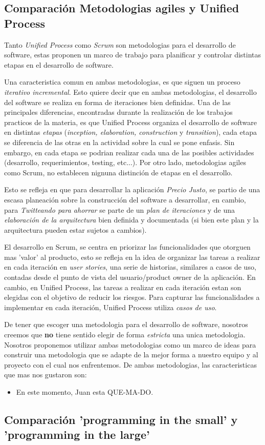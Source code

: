 \subsection{Comparación Metodologias agiles y Unified Process}

	Tanto \emph{Unified Process} como \emph{Scrum} son metodologias para el desarrollo de software, estas proponen un marco de trabajo para planificar y controlar distintas etapas en el desarrollo de software.

	Una caracteristica comun en ambas metodologias, es que siguen un proceso \emph{iterativo incremental}. Esto quiere decir que en ambas metodologias, el desarrollo del software se realiza en forma de iteraciones bien definidas. Una de las principales diferencias, encontradas durante la realización de los trabajos practicos de la materia, es que Unified Process organiza el desarrollo de software en distintas \emph{etapas} (\emph{inception, elaboration, construction} y \emph{transition}), cada etapa se diferencia de las otras en la actividad sobre la cual se pone enfasis. Sin embargo, en cada etapa se podrian realizar cada una de las posibles actividades (desarrollo, requerimientos, testing, etc...). Por otro lado, metodologias agiles como Scrum, no establecen nignuna distinción de etapas en el desarrollo.

	Esto se refleja en que para desarrollar la aplicación \emph{Precio Justo}, se partio de una escasa planeación sobre la construcción del software a desarrollar, en cambio, para \emph{Twitteando para ahorrar} se parte de un \emph{plan de iteraciones} y de una \emph{elaboración de la arquitectura} bien definida y documentada (si bien este plan y la arquitectura pueden estar sujetos a cambios).

	El desarrollo en Scrum, se centra en priorizar las funcionalidades que otorguen mas 'valor' al producto, esto se refleja en la idea de organizar las tareas a realizar en cada iteración en \emph{user stories}, una serie de historias, similares a casos de uso, contadas desde el punto de vista del usuario/product owner de la aplicación. En cambio, en Unified Process, las tareas a realizar en cada iteración estan son elegidas con el objetivo de reducir los riesgos. Para capturar las funcionalidades a implementar en cada iteración, Unified Process utiliza \emph{casos de uso}.

	De tener que escoger una metodologia para el desarrollo de software, nosotros creemos que \textbf{no} tiene sentido elegir de forma \emph{estricta} una unica metodologia. Nosotros proponemos utilizar ambas metodologias como un marco de ideas para construir una metodologia que se adapte de la mejor forma a nuestro equipo y al proyecto con el cual nos enfrentemos.
	De ambas metodologias, las caracteristicas que mas nos gustaron son:

	\begin{itemize}
		\item En este momento, Juan esta QUE-MA-DO.
	\end{itemize}

\subsection{Comparación 'programming in the small' y 'programming in the large'}

